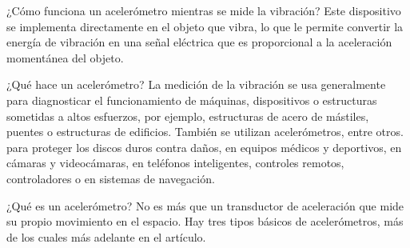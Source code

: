 ¿Cómo funciona un acelerómetro mientras se mide la vibración? Este dispositivo se implementa directamente en el objeto que vibra, lo que le permite convertir la energía de vibración en una señal eléctrica que es proporcional a la aceleración momentánea del objeto.

¿Qué hace un acelerómetro? La medición de la vibración se usa generalmente para diagnosticar el funcionamiento de máquinas, dispositivos o estructuras sometidas a altos esfuerzos, por ejemplo, estructuras de acero de mástiles, puentes o estructuras de edificios. También se utilizan acelerómetros, entre otros. para proteger los discos duros contra daños, en equipos médicos y deportivos, en cámaras y videocámaras, en teléfonos inteligentes, controles remotos, controladores o en sistemas de navegación.

¿Qué es un acelerómetro? No es más que un transductor de aceleración que mide su propio movimiento en el espacio. Hay tres tipos básicos de acelerómetros, más de los cuales más adelante en el artículo.

